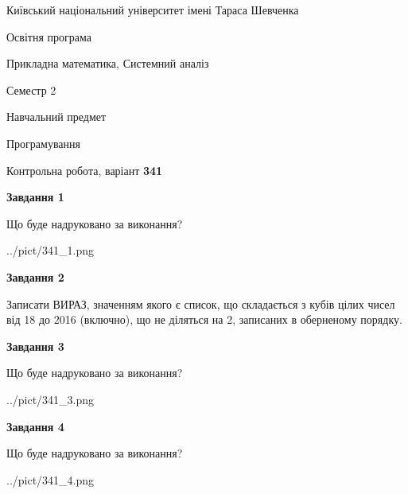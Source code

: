 \documentclass[12pt, ukrainian]{article}
\begin{document}
{{\begin {small}\par
{ \center  Київський національний університет імені Тараса Шевченка \par}
{\parbox {5 cm}{Освітня програма \hfill}{\parbox {8 cm}{Прикладна математика, Системний аналіз \hfill}}\parbox {5 cm}{\hfill Семестр 2}}\par
{\parbox {5 cm} {Навчальний предмет \hfill}\parbox {7 cm}{Програмування \hfill}\parbox {6cm}{\hfill}\par}\vspace{-7pt} \end{small}}{\center Контрольна робота, варіант  \No \textbf
{ 341 }\par}}
{
\begin {large}
{\begin {center}\textbf{Завдання 1}\end {center}}\par
Що буде надруковано за виконання?\par\par
\begin{center}
	{../pict/341_1.png}
\end{center}
\newpage

{\begin {center}\textbf{Завдання 2}\end {center}}\par

Записати ВИРАЗ, значенням якого є список, що складається з кубів цілих чисел від 18 до 2016 (включно), що не діляться на 2, записаних в обернено\-му порядку.\par
\newpage

{\begin {center}\textbf{Завдання 3}\end {center}}\par
Що буде надруковано за виконання?
\begin{center}
	{../pict/341_3.png}
\end{center}
\newpage

{\begin {center}\textbf{Завдання 4}\end {center}}\par
Що буде надруковано за виконання?\par
\begin{center}
	{../pict/341_4.png}
\end{center}
\newpage


\end{large}}
\end{document}
